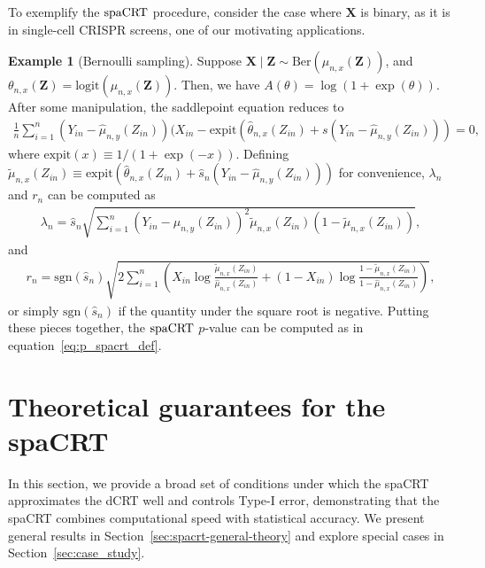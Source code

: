 \documentclass[12pt]{article}
\theoremstyle{definition}
\newtheorem{example}{Example}
\newcommand{\expit}{\mathrm{expit}}                 	%
\newcommand{\prx}{\bm X}								%
\newcommand{\srx}{X}									%
\newcommand{\prz}{\bm Z}								%
\newcommand{\srz}{Z}									%
\newcommand{\sry}{Y}									%
\newcommand{\spacrt}{\textnormal{spaCRT}}               %
\begin{document}
  To exemplify the $\spacrt$ procedure, consider the case where $\prx$ is binary, as it is in single-cell CRISPR screens, one of our motivating applications.
  
  \begin{example}[Bernoulli sampling]
	Suppose $\prx\mid\prz\sim \mathrm{Ber}(\mu_{n,x}(\prz))$, and $\theta_{n,x}(\prz) = \text{logit}(\mu_{n,x}(\prz))$. Then, we have $A(\theta) = \log(1 + \exp(\theta))$. After some manipulation, the saddlepoint equation reduces to 
	  \begin{align*}
		  \frac{1}{n}\sum_{i=1}^n (\sry_{in}-\widehat{\mu}_{n,y}(\srz_{in}))(\srx_{in}-\text{expit}(\widehat \theta_{n,x}(\srz_{in})+s(\sry_{in}-\widehat{\mu}_{n,y}(\srz_{in})))=0,
	  \end{align*}
    where $\expit(x)\equiv 1/ (1+\exp(-x))$. Defining $\widetilde \mu_{n,x}(Z_{in}) \equiv \text{expit}(\widehat \theta_{n,x}(\srz_{in})+\hat s_n(\sry_{in}-\widehat{\mu}_{n,y}(\srz_{in})))$ for convenience, $\lambda_n$ and $r_n$ can be computed as 
    \begin{align*}
      \lambda_n=\hat s_n \sqrt{\sum_{i=1}^n (\sry_{in}-\widehat{\mu}_{n,y}(\srz_{in}))^2\widetilde \mu_{n,x}(Z_{in})(1-\widetilde \mu_{n,x}(Z_{in}))},
    \end{align*}
    and
	  \begin{align*}
		  r_n=\mathrm{sgn}(\hat s_n)\sqrt{2\sum_{i=1}^n \left(X_{in} \log \frac{\widetilde \mu_{n,x}(Z_{in})}{\widehat \mu_{n,x}(Z_{in})} + (1 - X_{in})\log \frac{1 - \widetilde \mu_{n,x}(Z_{in})}{1 - \widehat \mu_{n,x}(Z_{in})}\right)},
	  \end{align*}
	or simply $\text{sgn}(\hat s_n)$ if the quantity under the square root is negative. Putting these pieces together, the $\spacrt$ $p$-value can be computed as in equation~\eqref{eq:p_spacrt_def}.	
  \end{example}
  
  \section{Theoretical guarantees for the spaCRT}\label{sec:general_results}
  
  In this section, we provide a broad set of conditions under which the spaCRT approximates the dCRT well and controls Type-I error, demonstrating that the spaCRT combines computational speed with statistical accuracy. We present general results in Section~\ref{sec:spacrt-general-theory} and explore special cases in Section~\ref{sec:case_study}. 
  
\end{document}

